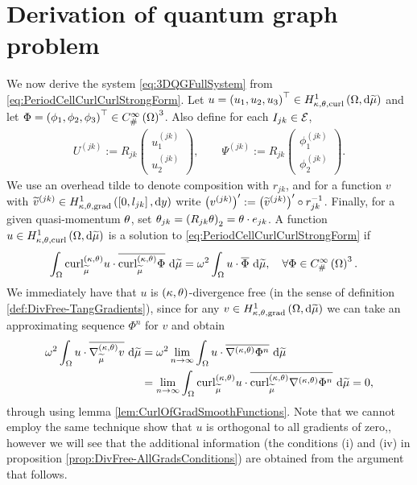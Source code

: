 \section{Derivation of quantum graph problem} \label{sec:3DSystemDerivation}
We now derive the system \eqref{eq:3DQGFullSystem} from \eqref{eq:PeriodCellCurlCurlStrongForm}.
Let $u=\left( u_1,u_2,u_3 \right)^\top\in H^1_{\kappa,\theta,\mathrm{curl}}\left( \Omega, \mathrm{d}\widetilde{\mu} \right)$ and let $\Phi=\left( \phi_1,\phi_2,\phi_3 \right)^\top\in C^{\infty}_{\#}\left( \Omega \right)^3$.
Also define for each $I_{jk}\in\mathcal{E}$,
\begin{align*}
	U^{(jk)} := R_{jk} \begin{pmatrix} u_1^{(jk)} \\ u_2^{(jk)} \end{pmatrix},
	\qquad
	\Psi^{(jk)} := R_{jk} \begin{pmatrix} \phi_1^{(jk)} \\ \phi_2^{(jk)} \end{pmatrix}.
\end{align*}
We use an overhead tilde to denote composition with $r_{jk}$, and for a function $v$ with $\widetilde{v}^{(jk)}\in H^1_{\kappa,\theta,\mathrm{grad}}\left( \left[ 0,l_{jk} \right], \mathrm{d}y \right)$ write $\left( v^{(jk)} \right)' := \left( \widetilde{v}^{(jk)} \right)' \circ r_{jk}^{-1}$.
Finally, for a given quasi-momentum $\theta$, set $\theta_{jk} = \left(  R_{jk}\theta  \right)_2 = \theta\cdot e_{jk}$.
A function $u\in H^1_{\kappa,\theta,\mathrm{curl}}\left( \Omega, \mathrm{d}\widetilde{\mu} \right)$ is a solution to \eqref{eq:PeriodCellCurlCurlStrongForm} if
\begin{align} \label{eq:PeriodCellCurlCurlWeakForm}
	\int_{\Omega} \mathrm{curl}_{\widetilde{\mu}}^{\left( \kappa, \theta \right)}u\cdot\overline{\mathrm{curl}_{\widetilde{\mu}}^{\left( \kappa, \theta \right)}\Phi}  \ \mathrm{d}\widetilde{\mu} 
	&= \omega^2 \int_{\Omega} u\cdot\overline{\Phi}  \ \mathrm{d}\widetilde{\mu},
	\quad\forall \Phi\in C^{\infty}_{\#}\left( \Omega \right)^3.
\end{align}
We immediately have that $u$ is $\left( \kappa, \theta \right)$-divergence free (in the sense of definition \ref{def:DivFree-TangGradients}), since for any $v\in H^1_{\kappa,\theta,\mathrm{grad}}\left( \Omega, \mathrm{d}\widetilde{\mu} \right)$ we can take an approximating sequence $\Phi^n$ for $v$ and obtain
\begin{align*}
	\omega^2\int_{\Omega} u\cdot\overline{\nabla^{\left( \kappa, \theta \right)}_{\widetilde{\mu}}v}  \ \mathrm{d}\widetilde{\mu}
	&= \omega^2 \lim_{n\rightarrow\infty} \int_{\Omega} u\cdot\overline{\nabla^{\left( \kappa, \theta \right)}\Phi^n}  \ \mathrm{d}\widetilde{\mu} \\
	&= \lim_{n\rightarrow\infty} \int_{\Omega} \mathrm{curl}_{\widetilde{\mu}}^{\left( \kappa, \theta \right)}u\cdot\overline{\mathrm{curl}_{\widetilde{\mu}}^{\left( \kappa, \theta \right)}\nabla^{\left( \kappa, \theta \right)}\Phi^n}  \ \mathrm{d}\widetilde{\mu}
	= 0,
\end{align*}
through using lemma \ref{lem:CurlOfGradSmoothFunctions}.
Note that we cannot employ the same technique show that $u$ is orthogonal to all gradients of zero,, however we will see that the additional information (the conditions (i) and (iv) in proposition \ref{prop:DivFree-AllGradsConditions}) are obtained from the argument that follows.

